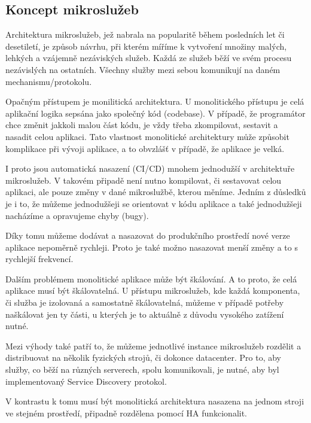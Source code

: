 \documentclass[thesis=M,czech]{FITthesis}[2019/12/23]
\theoremstyle{plain}
\theoremstyle{definition}
\begin{document}



\subsection{Koncept mikroslužeb}

Architektura mikroslužeb, jež nabrala na popularitě během posledních let či desetiletí, je způsob návrhu, při kterém míříme k vytvoření množiny malých, lehkých a vzájemně nezáviských služeb. Každá ze služeb běží ve svém procesu nezávislých na ostatních. Všechny služby mezi sebou komunikují na daném mechanismu/protokolu.

Opačným přístupem je monilitická architektura. U monolitického přístupu je celá aplikační logika sepsána jako společný kód (codebase). V případě, že programátor chce změnit jakkoli malou část kódu, je vždy třeba zkompilovat, sestavit a nasadit celou aplikaci. Tato vlastnost monolitické architektury může způsobit komplikace při vývoji aplikace, a to obvzlášť v případě, že aplikace je velká.

I proto jsou automatická nasazení (CI/CD) mnohem jednodužší v architektuře mikroslužeb. V takovém připadě není nutno kompilovat, či sestavovat celou aplikaci, ale pouze změny v dané mikroslužbě, kterou měníme. Jedním z důsledků je i to, že můžeme jednodužšeji se orientovat v kódu aplikace a také jednodužšeji nacházíme a opravujeme chyby (bugy).

Díky tomu můžeme dodávat a nasazovat do produkčního prostředí nové verze aplikace nepoměrně rychleji. Proto je také možno nasazovat menší změny a to s rychlejší frekvencí. 

Dalším problémem monolitické aplikace může být škálování. A to proto, že celá aplikace musí být škálovatelná. U přístupu mikroslužeb, kde každá komponenta, či služba je izolovaná a samostatně škálovatelná, můžeme v případě potřeby naškálovat jen ty části, u kterých je to aktuálně z důvodu vysokého zatížení nutné.

Mezi výhody také patří to, že můžeme jednotlivé instance mikroslužeb rozdělit a distribuovat na několik fyzických strojů, či dokonce datacenter. Pro to, aby služby, co běží na různých serverech, spolu komunikovali, je nutné, aby byl implementovaný Service Discovery protokol. 

V kontrastu k tomu musí být monolitická architektura nasazena na jednom stroji ve stejném prostředí, připadně rozdělena pomocí HA funkcionalit.
\end{document}
